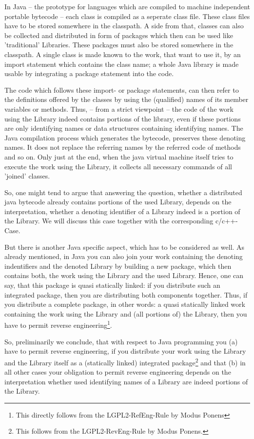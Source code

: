 In Java -- the prototype for languages which are compiled to machine independent
portable bytecode -- each class is compiled as a seperate class file. These
class files have to be stored somewhere in the classpath. A side from that,
classes can also be collected and distributed in form of packages which then can
be used like 'traditional' Libraries. These packages must also be stored
somewhere in the classpath. A single class is made known to the work, that want
to use it, by an import statement which contains the class name; a whole Java
library is made usable by integrating a package statement into the code.

The code which follows these import- or package statements, can then refer to
the definitions offered by the classes by using the (qualified) names of its
member variables or methods. Thus, -- from a strict viewpoint -- the code of the
work using the Library indeed contains portions of the library, even if these
portions are only identifying names or data structures containing identifying
names. The Java compilation process which generates the bytecode, preserves
these denoting names. It does not replace the referring names by the referred
code of methods and so on. Only just at the end, when the java virtual machine
itself tries to execute the work using the Library, it collects all necessary
commands of all 'joined' classes.

So, one might tend to argue that answering the question, whether a distributed
java bytecode already contains portions of the used Library, depends on the
interpretation, whether a denoting identifier of a Library indeed is a portion
of the Library. We will discuss this case together with the corresponding
c/c++-Case. 

But there is another Java specific aspect, which has to be considered as well.
As already mentioned, in Java you can also join your work containing the
denoting indentifiers and the denoted Library by building a new package, which
then contains both, the work using the Library and the used Library. Hence, one
can say, that this package is quasi statically linked: if you distribute such an
integrated package, then you are distributing both components together. Thus, if
you distribute a complete package, in other words: a quasi statically linked
work containing the work using the Library and (all portions of) the Library,
then you have to permit reverse engineering\footnote{This directly follows from
the LGPL2-RefEng-Rule by Modus Ponens}.

So, preliminarily we conclude, that with respect to Java programming you (a)
have to permit reverse engineering, if you distribute your work using the
Library and the Library itself as a (statically linked) integrated
package\footnote{This follows from the LGPL2-RevEng-Rule by Modus Ponens.} and
that (b) in all other cases your obligation to permit reverse engineering
depends on the interpretation whether used identifying names of a Library are
indeed portions of the Library.

